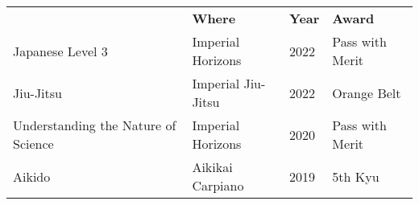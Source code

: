 \documentclass{res}[12pt] %
\begin{document}
\begin{resume}
\sectionRule

{\large
\renewcommand{\arraystretch}{1.5}
\begin{tabularx}{\textwidth}{ p{200pt} X p{30pt} X }
     & \textbf{Where} & \textbf{Year} & \textbf{Award} \\
    Japanese Level 3 & Imperial Horizons & 2022 & Pass with Merit \\
    Jiu-Jitsu & Imperial Jiu-Jitsu & 2022 & Orange Belt \\
    Understanding the Nature of Science & Imperial Horizons & 2020 & Pass with Merit \\
    Aikido & Aikikai Carpiano & 2019 & 5th Kyu \\
\end{tabularx}
}

\begin{comment}
\newpage


\begin{minipage}{0.5\textwidth}
    \begin{tikzpicture}[x=1cm,y=0.8cm]
        \draw[thick,-stealth] (0,0) -- (0,20);
        \foreach \y/\year/\event/\description in {
            1/2016/Bachelor's Degree in Computer Science/{},
            3/2018/Internship at XYZ Company/{},
            5/2019/Master's Degree in Computer Science/{},
            7/2020/Research Assistant at University of ABC/{},
            9/2022/Software Developer at XYZ Company/{}
        } {
            \draw (0,\y) -- (-0.2,\y);
            \node[anchor=east, font=\small] at (-0.3,\y) {\year};
            \node[anchor=west, font=\small] at (0.3,\y) {\event};
            \node[anchor=west, text width=9cm, font=\footnotesize] at (1,\y) {\description};
        }
    \end{tikzpicture}
\end{minipage}
\hfill
\begin{minipage}{0.5\textwidth}
\end{minipage}

\end{comment}



\vspace{0.2in} %

\end{resume} 
\end{document}
